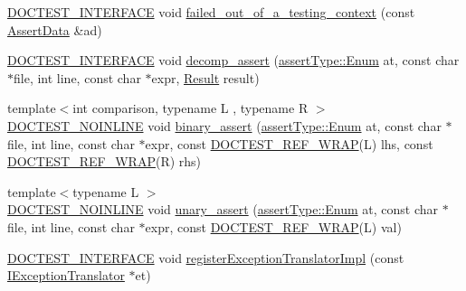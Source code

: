 \begin{DoxyCompactItemize}
\item 
\hyperlink{doctest_8h_a9c16ffc635ec47f07797d21ede26b1a5}{D\+O\+C\+T\+E\+S\+T\+\_\+\+I\+N\+T\+E\+R\+F\+A\+CE} void \hyperlink{namespacedoctest_1_1detail_a0ff832be68bf666d856aefd539e1ce81}{failed\+\_\+out\+\_\+of\+\_\+a\+\_\+testing\+\_\+context} (const \hyperlink{structdoctest_1_1_assert_data}{Assert\+Data} \&ad)
\item 
\hyperlink{doctest_8h_a9c16ffc635ec47f07797d21ede26b1a5}{D\+O\+C\+T\+E\+S\+T\+\_\+\+I\+N\+T\+E\+R\+F\+A\+CE} void \hyperlink{namespacedoctest_1_1detail_a6d4efb043e9e5a6fa0db64f0e230a7a7}{decomp\+\_\+assert} (\hyperlink{namespacedoctest_1_1assert_type_ae1bb5bed722f34f1c38b83cb19d326d3}{assert\+Type\+::\+Enum} at, const char $\ast$file, int line, const char $\ast$expr, \hyperlink{structdoctest_1_1detail_1_1_result}{Result} result)
\item 
{\footnotesize template$<$int comparison, typename L , typename R $>$ }\\\hyperlink{doctest_8h_a47e9d3609dfcc90b9a630ff33b9524d6}{D\+O\+C\+T\+E\+S\+T\+\_\+\+N\+O\+I\+N\+L\+I\+NE} void \hyperlink{namespacedoctest_1_1detail_a570279a22ca888528e87a426853a0288}{binary\+\_\+assert} (\hyperlink{namespacedoctest_1_1assert_type_ae1bb5bed722f34f1c38b83cb19d326d3}{assert\+Type\+::\+Enum} at, const char $\ast$file, int line, const char $\ast$expr, const \hyperlink{doctest_8h_af2901cafb023c57fb672ccb1bf14f2eb}{D\+O\+C\+T\+E\+S\+T\+\_\+\+R\+E\+F\+\_\+\+W\+R\+AP}(L) lhs, const \hyperlink{doctest_8h_af2901cafb023c57fb672ccb1bf14f2eb}{D\+O\+C\+T\+E\+S\+T\+\_\+\+R\+E\+F\+\_\+\+W\+R\+AP}(R) rhs)
\item 
{\footnotesize template$<$typename L $>$ }\\\hyperlink{doctest_8h_a47e9d3609dfcc90b9a630ff33b9524d6}{D\+O\+C\+T\+E\+S\+T\+\_\+\+N\+O\+I\+N\+L\+I\+NE} void \hyperlink{namespacedoctest_1_1detail_a5343d1b26df7f86767d5e7026c03bf0f}{unary\+\_\+assert} (\hyperlink{namespacedoctest_1_1assert_type_ae1bb5bed722f34f1c38b83cb19d326d3}{assert\+Type\+::\+Enum} at, const char $\ast$file, int line, const char $\ast$expr, const \hyperlink{doctest_8h_af2901cafb023c57fb672ccb1bf14f2eb}{D\+O\+C\+T\+E\+S\+T\+\_\+\+R\+E\+F\+\_\+\+W\+R\+AP}(L) val)
\item 
\hyperlink{doctest_8h_a9c16ffc635ec47f07797d21ede26b1a5}{D\+O\+C\+T\+E\+S\+T\+\_\+\+I\+N\+T\+E\+R\+F\+A\+CE} void \hyperlink{namespacedoctest_1_1detail_a3887426da16e0d12e6f0e270a767a6a5}{register\+Exception\+Translator\+Impl} (const \hyperlink{structdoctest_1_1detail_1_1_i_exception_translator}{I\+Exception\+Translator} $\ast$et)

\end{DoxyCompactItemize}
